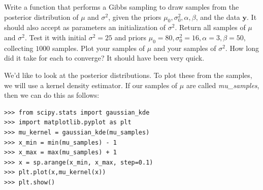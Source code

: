 \begin{problem}
Write a function that performs a Gibbs sampling to draw samples from the posterior distribution of $\mu$ and $\sigma^{2}$, given the priors $\mu_{0}, \sigma_{0}^{2}, \alpha,\beta$, and the data $\mathbf{y}$. It should also accept as parameters an initialization of $\sigma^{2}$. Return all samples of $\mu$ and $\sigma^{2}$. Test it with initial $\sigma^{2} = 25$ and priors $\mu_{0}=80, \sigma_{0}^{2} = 16, \alpha = 3, \beta = 50$, collecting $1000$ samples. Plot your samples of $\mu$ and your samples of $\sigma^{2}$. How long did it take for each to converge? It should have been very quick.
\end{problem}

We'd like to look at the posterior distributions. To plot these from the samples, we will use a kernel density estimator. If our samples of $\mu$ are called \emph{mu\_samples}, then we can do this as follows:
\begin{lstlisting}
>>> from scipy.stats import gaussian_kde
>>> import matplotlib.pyplot as plt
>>> mu_kernel = gaussian_kde(mu_samples)
>>> x_min = min(mu_samples) - 1
>>> x_max = max(mu_samples) + 1
>>> x = sp.arange(x_min, x_max, step=0.1)
>>> plt.plot(x,mu_kernel(x))
>>> plt.show()
\end{lstlisting}

